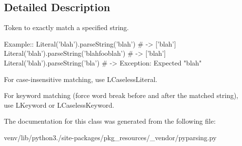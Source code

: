 \subsection{Detailed Description}
\begin{DoxyVerb}Token to exactly match a specified string.

Example::
    Literal('blah').parseString('blah')  # -> ['blah']
    Literal('blah').parseString('blahfooblah')  # -> ['blah']
    Literal('blah').parseString('bla')  # -> Exception: Expected "blah"

For case-insensitive matching, use L{CaselessLiteral}.

For keyword matching (force word break before and after the matched string),
use L{Keyword} or L{CaselessKeyword}.
\end{DoxyVerb}
 

The documentation for this class was generated from the following file\+:\begin{DoxyCompactItemize}
\item 
venv/lib/python3./site-\/packages/pkg\+\_\+resources/\+\_\+vendor/pyparsing.\+py\end{DoxyCompactItemize}
